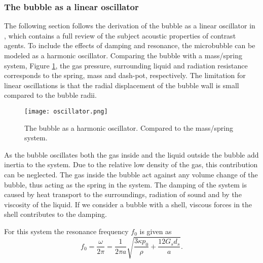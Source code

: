 \subsubsection{The bubble as a linear oscillator}
The following section follows the derivation of the bubble as a linear oscillator in \cite{Hoff2000}, which contains a full review of the subject acoustic properties of contrast agents. To include the effects of damping and resonance, the microbubble can be modeled as a harmonic oscillator. Comparing the bubble with a mass/spring system, Figure \ref{Fig:oscillator}, the gas pressure, surrounding liquid and radiation resistance corresponds to the spring, mass and dash-pot, respectively. The limitation for linear oscillations is that the radial displacement of the bubble wall is small compared to the bubble radii. 

\begin{figure}[h]
  \centering
  \label{Fig:oscillator}
  \texttt{[image: oscillator.png]}
  \caption{The bubble as a harmonic oscillator. Compared to the mass/spring system\cite{Hoff2000}.}
\end{figure} 

As the bubble oscillates both the gas inside and the liquid outside the bubble add inertia to the system. Due to the relative low density of the gas, this contribution can be neglected. The gas inside the bubble act against any volume change of the bubble, thus acting as the spring in the system. The damping of the system is caused by heat transport to the surroundings, radiation of sound and by the viscosity of the liquid. If we consider a bubble with a shell, viscous forces in the shell contributes to the damping. 

%
%

For this system the resonance frequency $f_0$ is given as \cite{Hoff2000}
\begin{equation}
\label{resonance}
f_0 = \frac{\omega}{2 \pi}= \frac{1}{2 \pi a} \sqrt{\frac{3\kappa p_0}{\rho}+ \frac{12 G_s d_s}{a}}.
\end{equation} 

